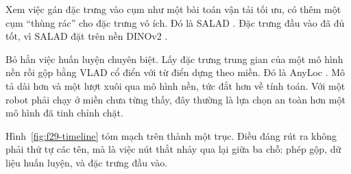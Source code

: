 \documentclass[../../deep_learning.tex]{subfiles}
\begin{document}
\begin{mach}
      \gp Xem việc gán đặc trưng vào cụm như một bài toán vận tải tối ưu, có thêm một cụm ``thùng rác'' cho đặc trưng vô ích. Đó là SALAD \cite{f29izquierdo2024optimal}.
      \gd Đặc trưng đầu vào đã đủ tốt, vì SALAD đặt trên nền DINOv2 \cite{oquab2024dinov2}.
\item {}
      \gp Bỏ hẳn việc huấn luyện chuyên biệt. Lấy đặc trưng trung gian của một mô hình nền rồi gộp bằng VLAD cổ điển với từ điển dựng theo miền. Đó là AnyLoc \cite{f29keetha2024anyloc}.
      \gia Mô tả dài hơn và một lượt xuôi qua mô hình nền, tức đắt hơn về tính toán.
      \hq Với một robot phải chạy ở miền chưa từng thấy, đây thường là lựa chọn an toàn hơn một mô hình đã tinh chỉnh chặt.
\end{mach}

Hình~\ref{fig:f29-timeline} tóm mạch trên thành một trục. Điều đáng rút ra không phải thứ tự các tên, mà là việc nút thắt nhảy qua lại giữa ba chỗ: phép gộp, dữ liệu huấn luyện, và đặc trưng đầu vào.
\end{document}
